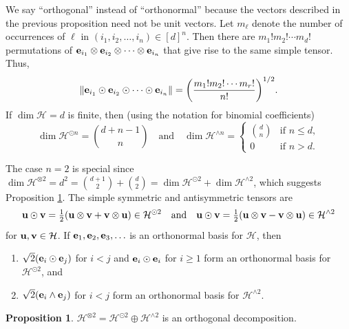 \documentclass[10pt,reqno]{amsart}
\newcommand{\0}{{\color{lightgray}0}}
\renewcommand{\leq}{\leqslant}
\renewcommand{\geq}{\geqslant}
\newcommand{\norm}[1]{\| #1 \|}
\newcommand{\h}{\mathcal{H}}
\renewcommand{\vec}[1]{{\bf #1}}
\theoremstyle{definition}
\newtheorem{Proposition}[equation]{Proposition}
\numberwithin{equation}{section}
\begin{document}
We say ``orthogonal'' instead of ``orthonormal'' because the vectors described in the previous
proposition need not be unit vectors.
Let $m_{\ell}$ denote the number of occurrences of $\ell$ in $(i_1,i_2,\ldots,i_n) \in [d]^n$.  Then there are
${m_1! m_2! \cdots m_d!}$ permutations of $\vec{e}_{i_1} \otimes \vec{e}_{i_2} \otimes \cdots \otimes \vec{e}_{i_n}$ that give rise to the same simple tensor. Thus,
\begin{equation*}
\norm{\vec{e}_{i_1} \odot \vec{e}_{i_2} \odot \cdots \odot \vec{e}_{i_n}}
= \bigg(\frac{m_1! m_2! \cdots m_r!} {n!}\bigg)^{1/2}.
\end{equation*}
If $\dim \h = d$ is finite, then (using the notation for binomial coefficients)
\begin{equation*}
\dim \h^{\odot n} =\binom{d+n-1}{n}
\quad \text{and} \quad
\dim \h^{\wedge n} = 
\begin{cases}
\binom{d}{n} & \text{if $n \leq  d$},\\[2pt]
0 & \text{if $n > d$}.
\end{cases}
\end{equation*}

The case $n=2$ is special since 
$\dim \h^{\otimes 2} = d^2 = \binom{d+1}{2} + \binom{d}{2} = \dim \h^{\odot 2} + \dim \h^{\wedge 2}$,
which suggests Proposition \ref{Proposition:TwoSum}.
The simple symmetric and antisymmetric tensors are 
\begin{equation*}
\vec{u}\odot \vec{v}=\tfrac{1}{2}( \vec{u}\otimes \vec{v} + \vec{v} \otimes \vec{u}) \in \h^{\odot 2} \quad \text{and}\quad  
\vec{u}\odot \vec{v}=\tfrac{1}{2}( \vec{u}\otimes \vec{v} - \vec{v} \otimes \vec{u}) \in \h^{\wedge 2} 
\end{equation*}
for $\vec{u}, \vec{v} \in \h$.
If $\vec{e}_1, \vec{e}_2, \vec{e}_3,\ldots $ is an orthonormal basis for $\h$, then
\begin{enumerate}
    \item $\sqrt{2}(\vec{e}_i \odot \vec{e}_j)$ for $i < j$ and $\vec{e}_i \odot \vec{e}_i$ for $i \geq 1$ 
    form an orthonormal basis for $\h^{\odot 2}$, and

    \item $\sqrt{2}(\vec{e}_i \wedge \vec{e}_j)$  for $i < j$ form an orthonormal basis for $\h^{\wedge 2}$.
\end{enumerate}

\begin{Proposition}\label{Proposition:TwoSum}
$\h^{\otimes 2}= \h^{\odot 2} \oplus \h^{\wedge 2}$ is an orthogonal decomposition.
\end{Proposition}
\end{document}
